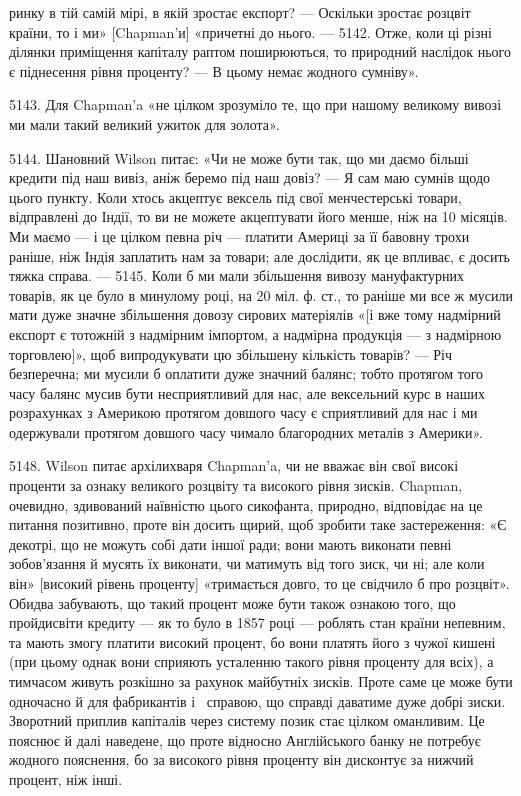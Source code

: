 \parcont{}  %
ринку в тій самій мірі, в якій зростає експорт? — Оскільки зростає розцвіт
країни, то і ми» [Chapman’и] «причетні до нього. — 5142. Отже, коли ці різні
ділянки приміщення капіталу раптом поширюються, то природний наслідок нього
є піднесення рівня проценту? — В цьому немає жодного сумніву».

5143. Для Chapman’a «не цілком зрозуміло те, що при нашому великому
вивозі ми мали такий великий ужиток для золота».

5144. Шановний Wilson питає: «Чи не може бути так, що ми даємо більші
кредити під наш вивіз, аніж беремо під наш довіз? — Я сам маю сумнів щодо цього
пункту. Коли хтось акцептує вексель під свої менчестерські товари, відправлені
до Індії, то ви не можете акцептувати його менше, ніж на 10 місяців.
Ми маємо — і це цілком певна річ — платити Америці за її бавовну трохи раніше,
ніж Індія заплатить нам за товари; але дослідити, як це впливає, є досить
тяжка справа. — 5145. Коли б ми мали збільшення вивозу мануфактурних
товарів, як це було в минулому році, на 20 міл. ф. ст., то раніше ми все ж
мусили мати дуже значне збільшення довозу сирових матеріялів «[і вже тому надмірний
експорт є тотожній з надмірним імпортом, а надмірна продукція — з надмірною
торговлею]», щоб випродукувати цю збільшену кількість товарів? — Річ
безперечна; ми мусили б оплатити дуже значний балянс; тобто протягом того
часу балянс мусив бути несприятливий для нас, але вексельний курс в наших
розрахунках з Америкою протягом довшого часу є сприятливий для нас і ми
одержували протягом довшого часу чимало благородних металів з Америки».

5148. Wilson питає архілихваря Chapman’a, чи не вважає він свої високі
проценти за ознаку великого розцвіту та високого рівня зисків. Chapman, очевидно,
здивований наївністю цього сикофанта, природно, відповідає на це питання
позитивно, проте він досить щирий, щоб зробити таке застереження: «Є декотрі,
що не можуть собі дати іншої ради; вони мають виконати певні зобов'язання
й мусять їх виконати, чи матимуть від того зиск, чи ні; але коли він»
[високий рівень проценту] «тримається довго, то це свідчило б про розцвіт». Обидва
забувають, що такий процент може бути також ознакою того, що пройдисвіти
кредиту — як то було в 1857 році — роблять стан країни непевним, та мають змогу
платити високий процент, бо вони платять його з чужої кишені (при цьому однак
вони сприяють усталенню такого рівня проценту для всіх), а тимчасом живуть
розкішно за рахунок майбутніх зисків. Проте саме це може бути одночасно й для
фабрикантів і~ справою, що справді даватиме дуже добрі зиски. Зворотний
приплив капіталів через систему позик стає цілком оманливим. Це пояснює й
далі наведене, що проте відносно Англійського банку не потребує жодного пояснення,
бо за високого рівня проценту він дисконтує за нижчий процент, ніж інші.


